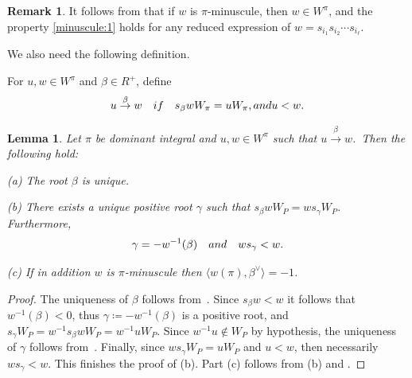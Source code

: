 \documentclass[11pt]{article}
\newtheorem{lemma}[theo]{Lemma}
\theoremstyle{definition}
\newtheorem{remark}[theo]{Remark}
\numberwithin{equation}{section}
\begin{document}
\begin{remark}\label{rem:wminuscule}
	It follows from  that if $w$ is $\pi$-minuscule, then $w\in W^\pi$,
	and
	the property \eqref{minuscule:1} holds for any reduced expression 
	of $w=s_{i_1} s_{i_2}\cdots s_{i_\ell}$.
\end{remark}
We also need the following definition.
\begin{defin}\label{defin:order}
	For $u,w\in W^\pi$ and $\beta\in R^{+}$, define 
	\begin{equation*}\label{equ:order}
		u \overset{\beta}{\to} w \textit{\quad if \quad}  s_\beta wW_\pi=uW_\pi, \textit{ and }u<w.
	\end{equation*}
\end{defin}
\begin{lemma}\label{lemma:ubetav} Let $\pi$ be dominant integral and $u,w \in W^\pi$ such that 
	$u \overset{\beta}{\to} w$.~Then the following hold:
	
	(a) The root $\beta$ is unique.
	
	(b) There exists a unique positive root $\gamma$ such that $s_\beta w W_P = w s_\gamma W_P$.
	Furthermore, 
	\[ \gamma= - w^{-1}(\beta) \quad \textrm{ and } \quad ws_\gamma < w \/. \]
		
	(c) If in addition $w$ is $\pi$-minuscule then $\langle w(\pi), \beta^\vee \rangle = -1$.
\end{lemma}
\begin{proof} The uniqueness of $\beta$ follows from~\cite[Lemma 4.1]{fulton.woodward}. Since 
	$s_\beta w <w$ it follows that $w^{-1}(\beta)<0$, thus $\gamma\coloneqq  - w^{-1}(\beta)$ is a positive root,
	and $s_\gamma W_P = w^{-1} s_\beta w W_P = w^{-1} u W_P$. Since $w^{-1}u \notin W_P$ by hypothesis, the uniqueness of $\gamma$ follows from~\cite[Lemma 2.2]{buch.m:nbhds}. 
	Finally, since $ws_\gamma W_P = u W_P$ and $u <w$, then necessarily
	$ws_\gamma < w$. This finishes the proof of (b). Part (c) follows from (b) and .
\end{proof}
\end{document}
